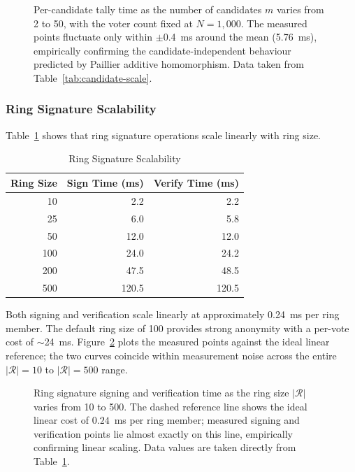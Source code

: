 \begin{figure}[H]
\centering

\caption[Tally Time versus Candidate Count]{Per-candidate tally time as the number of candidates $m$ varies from 2 to 50, with the voter count fixed at $N=1{,}000$. The measured points fluctuate only within $\pm$0.4~ms around the mean (5.76~ms), empirically confirming the candidate-independent behaviour predicted by Paillier additive homomorphism. Data taken from Table~\ref{tab:candidate-scale}.}
\label{fig:candidate-scale}
\end{figure}

\subsubsection{Ring Signature Scalability}
\label{subsubsec:ring-scale}

Table~\ref{tab:ring-scale} shows that ring signature operations scale linearly with ring size.

\begin{table}[H]
\centering
\caption{Ring Signature Scalability}
\label{tab:ring-scale}
\begin{tabular}{|r|r|r|}
\hline
\textbf{Ring Size} & \textbf{Sign Time (ms)} & \textbf{Verify Time (ms)} \\
\hline
10 & 2.2 & 2.2 \\
\hline
25 & 6.0 & 5.8 \\
\hline
50 & 12.0 & 12.0 \\
\hline
100 & 24.0 & 24.2 \\
\hline
200 & 47.5 & 48.5 \\
\hline
500 & 120.5 & 120.5 \\
\hline
\end{tabular}
\end{table}

Both signing and verification scale linearly at approximately 0.24~ms per ring member. The default ring size of 100 provides strong anonymity with a per-vote cost of $\sim$24~ms. Figure~\ref{fig:ring-scale} plots the measured points against the ideal linear reference; the two curves coincide within measurement noise across the entire $|\mathcal{R}|=10$ to $|\mathcal{R}|=500$ range.

\begin{figure}[H]
\centering

\caption[Ring Signature Sign and Verify Scaling]{Ring signature signing and verification time as the ring size $|\mathcal{R}|$ varies from 10 to 500. The dashed reference line shows the ideal linear cost of $0.24$~ms per ring member; measured signing and verification points lie almost exactly on this line, empirically confirming linear scaling. Data values are taken directly from Table~\ref{tab:ring-scale}.}
\label{fig:ring-scale}
\end{figure}

